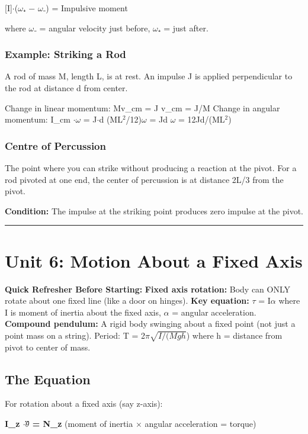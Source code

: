 \documentclass[12pt,a4paper,openany]{book}
\begin{document}
{{[I]$\cdot$($\omega$₊ − $\omega$₋) = Impulsive moment

where $\omega$₋ = angular velocity just before, $\omega$₊ = just after.

\subsubsection{Example: Striking a Rod}
A rod of mass M, length L, is at rest. An impulse J is applied perpendicular to the rod at distance d from center.

Change in linear momentum: Mv_cm = J  v_cm = J/M
Change in angular momentum: I_cm $\cdot\omega$ = J$\cdot$d  (ML$^2$/12)$\omega$ = Jd  $\omega$ = 12Jd/(ML$^2$)

\subsubsection{Centre of Percussion}
The point where you can strike without producing a reaction at the pivot. For a rod pivoted at one end, the center of percussion is at distance 2L/3 from the pivot.

\textbf{Condition:} The impulse at the striking point produces zero impulse at the pivot.

\bigskip\noindent\rule{\textwidth}{0.4pt}\bigskip

\section{Unit 6: Motion About a Fixed Axis}

\begin{prereqbox}
 \textbf{Quick Refresher Before Starting:}
\textbf{Fixed axis rotation:} Body can ONLY rotate about one fixed line (like a door on hinges).
\textbf{Key equation:} $\tau$ = I$\alpha$ where I is moment of inertia about the fixed axis, $\alpha$ = angular acceleration.
\textbf{Compound pendulum:} A rigid body swinging about a fixed point (not just a point mass on a string).
Period: T = 2$\pi$$\sqrt{I/(Mgh}$) where h = distance from pivot to center of mass.
\end{prereqbox}


\subsection{The Equation}

For rotation about a fixed axis (say z-axis):

\textbf{I_z $\cdot\theta$̈ = N_z} (moment of inertia $\times$ angular acceleration = torque)

}}
\end{document}
